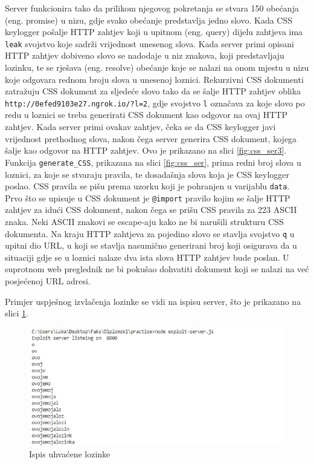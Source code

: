\documentclass[12pt, oneside, onecolumn]{book}
\begin{document}
{Server funkcionira tako da prilikom njegovog pokretanja se stvara 150 obećanja (eng. promise) u nizu, gdje svako obećanje predstavlja jedno slovo. Kada CSS keylogger pošalje HTTP zahtjev koji u upitnom (eng. query) dijelu zahtjeva ima \texttt{leak} svojstvo koje sadrži vrijednost unesenog slova. Kada server primi opisani HTTP zahtjev dobiveno slovo se nadodaje u niz znakova, koji predstavljaju lozinku, te se rješava (eng. resolve) obećanje koje se nalazi na onom mjestu u nizu koje odgovara rednom broju slova u unesenoj loznici. Rekurzivni CSS dokumenti zatražuju CSS dokument za sljedeće slovo tako da se šalje HTTP zahtjev oblika \texttt{http://0efed9103e27.ngrok.io/?l=2}, gdje svojstvo \texttt{l} označava za koje slovo po redu u loznici se treba generirati CSS dokument kao odgovor na ovaj HTTP zahtjev. Kada server primi ovakav zahtjev, čeka se da CSS keylogger javi vrijednost prethodnog slova, nakon čega server generira CSS dokument, kojega šalje kao odgovor na HTTP zahtjev. Ovo je prikazano na slici \ref{fig:css_ser3}. Funkcija \texttt{generate\_CSS}, prikazana na slici \ref{fig:css_ser}, prima redni broj slova u loznici, za koje se stvaraju pravila, te dosadašnja slova koja je CSS keylogger poslao. CSS pravila se pišu prema uzorku koji je pohranjen u varijablu \texttt{data}. Prvo što se upisuje u CSS dokument je \texttt{@import} pravilo kojim se šalje HTTP zahtjev za idući CSS dokument, nakon čega se  prišu CSS pravila za 223 ASCII znaka. Neki ASCII znakovi se escape-aju kako ne bi narušili strukturu CSS dokumenta. Na kraju HTTP zahtjeva za pojedino slovo se stavlja svojstvo \texttt{q} u upitni dio URL, u koji se stavlja nasumično generirani broj koji osigurava da u situaciji gdje se u loznici nalaze dva ista slova HTTP zahtjev bude poslan. U suprotnom web preglednik ne bi pokušao dohvatiti dokument koji se nalazi na već posjećenoj URL adresi.

Primjer uspješnog izvlačenja lozinke se vidi na ispisu server, što je prikazano na slici \ref{fig:css_pass}.

\begin{figure}[H]
	\begin{center}
		\includegraphics[width=\textwidth]{css_pass.jpg}
		\caption{Ispis uhvaćene lozinke} \label{fig:css_pass}
	\end{center}
\end{figure}

}
\end{document}
